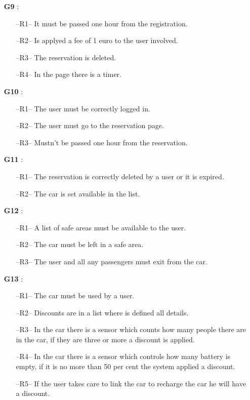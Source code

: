 \begin{itemize}
\clearpage

\item[\textbf{G9}]:
\begin{itemize}
\item[--R1--] It must be passed one hour from the registration.
\item[--R2--] Is applyed a fee of 1 euro to the user involved.
\item[--R3--] The reservation is deleted.
\item[--R4--] In the page there is a timer.
\end{itemize}

\item[\textbf{G10}]:
\begin{itemize}
\item[--R1--] The user must be correctly logged in.
\item[--R2--] The user must go to the reservation page.
\item[--R3--] Mustn't be passed one hour from the reservation.
\end{itemize}

\item[\textbf{G11}]:
\begin{itemize}
\item[--R1--] The reservation is correctly deleted by a user or it is expired. 
\item[--R2--] The car is set available in the list.

\end{itemize}

\item[\textbf{G12}]:
\begin{itemize}
\item[--R1--] A list of safe areas must be available to the user.
\item[--R2--] The car must be left in a safe area.
\item[--R3--] The user and all any passengers must exit from the car.
\end{itemize}

\item[\textbf{G13}]:
\begin{itemize}
\item[--R1--] The car must be used by a user.
\item[--R2--] Discounts are in a list where is defined all details.
\item[--R3--] In the car there is a sensor which counts how many people there are in the car, if they are three or more a discount is applied.
\item[--R4--] In the car there is a sensor which controls how many battery is empty, if it is no more than 50 per cent the system applied a discount.
\item[--R5--] If the user takes care to link the car to recharge the car he will have a discount.
\end{itemize}


\end{itemize}
